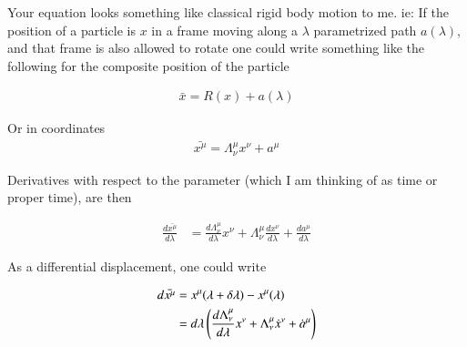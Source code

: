 
%
%





%

Your equation looks something like classical rigid body motion to me. ie: 
If the position of a particle is $x$ in a frame moving along a $\lambda$ parametrized path $a(\lambda)$, and that
frame is also allowed to rotate one could write something like the following for the
composite position of the particle

\begin{align*}
\bar{x} = R(x) + a(\lambda)
\end{align*}

Or in coordinates
\begin{align*}
\bar{x^\mu} = \Lambda^\mu_\nu x^\nu + a^\mu
\end{align*}

Derivatives with respect to the parameter (which I am thinking of as time or proper time), are then

\begin{align*}
\frac{d\bar{x^\mu}}{d\lambda} 
&= 
\frac{d \Lambda^\mu_\nu}{d\lambda} x^\nu 
+ \Lambda^\mu_\nu \frac{d x^\nu}{d\lambda}
+ \frac{d a^\mu}{d\lambda}
\end{align*}

As a differential displacement, one could write

\begin{align*}
d\bar{x^\mu}
&= x^\mu(\lambda + \delta\lambda) - x^\mu(\lambda) \\
&= 
d\lambda \left(
\frac{d \Lambda^\mu_\nu}{d\lambda} x^\nu 
+ \Lambda^\mu_\nu \dot{x}^\nu
+ \dot{a}^\mu
\right)
\end{align*}

